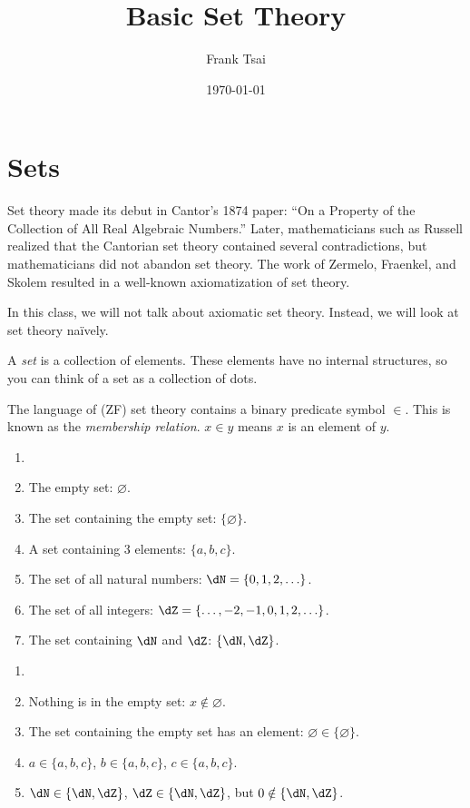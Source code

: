 \documentclass{amsart}
\title{Basic Set Theory}
\author{Frank Tsai}
\date{\today}
\begin{document}
\maketitle
\tableofcontents

\section{Sets}
\label{sec:sets}

Set theory made its debut in Cantor's 1874 paper: ``On a Property of the Collection of All Real Algebraic Numbers.''
Later, mathematicians such as Russell realized that the Cantorian set theory contained several contradictions, but mathematicians did not abandon set theory.
The work of Zermelo, Fraenkel, and Skolem resulted in a well-known axiomatization of set theory.

In this class, we will not talk about axiomatic set theory.
Instead, we will look at set theory na\"ively.

\begin{defn}
  A \emph{set} is a collection of elements.
  These elements have no internal structures, so you can think of a set as a collection of dots.

  The language of (ZF) set theory contains a binary predicate symbol $\in$.
  This is known as the \emph{membership relation}.
  $x \in y$ means $x$ is an element of $y$.
\end{defn}

\begin{eg}
  \begin{enumerate}
  \item[]
  \item The empty set: $\varnothing$.
  \item The set containing the empty set: $\{\varnothing\}$.
  \item A set containing 3 elements: $\{ a,b,c \}$.
  \item The set of all natural numbers: $\dN = \{ 0,1,2,\ldots \}$.
  \item The set of all integers: $\dZ = \{ \ldots,-2,-1,0,1,2,\ldots \}$.
  \item The set containing $\dN$ and $\dZ$: $\{ \dN,\dZ \}$.
  \end{enumerate}
\end{eg}

\begin{eg}
  \begin{enumerate}
  \item[]
  \item Nothing is in the empty set: $x \notin \varnothing$.
  \item The set containing the empty set has an element: $\varnothing \in \{\varnothing\}$.
  \item $a \in \{ a, b, c \}$, $b \in \{ a, b, c \}$, $c \in \{ a, b, c \}$.
  \item $\dN \in \{ \dN, \dZ \}$, $\dZ \in \{ \dN, \dZ \}$, but $0 \notin \{ \dN,\dZ \}$.
  \end{enumerate}
\end{eg}
\end{document}
